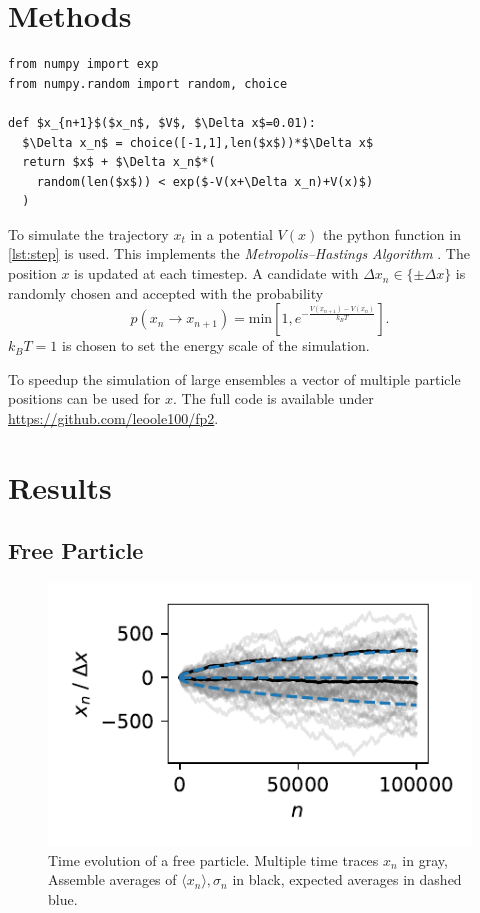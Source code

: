 \documentclass[
    parskip=half, 
    twoside=false,
    twocolumn=true,
    fontsize=11pt,
]{scrarticle}
\begin{document}
\section{Methods}
\begin{lstlisting}[caption={Python function used for time evolution.},label={lst:step},captionpos=b]
from numpy import exp
from numpy.random import random, choice

def $x_{n+1}$($x_n$, $V$, $\Delta x$=0.01):
  $\Delta x_n$ = choice([-1,1],len($x$))*$\Delta x$
  return $x$ + $\Delta x_n$*(
    random(len($x$)) < exp($-V(x+\Delta x_n)+V(x)$)
  )
\end{lstlisting}
To simulate the trajectory $x_t$ in a potential $V(x)$ the python function in \autoref{lst:step} is used.
This implements the \textit{Metropolis–Hastings Algorithm} \cite{noauthor_metropolis-algorithmus_2024}.
The position $x$ is updated at each timestep.
A candidate with $\Delta x_n \in \{\pm \Delta x\}$ is randomly chosen and accepted with the probability
$$ p(x_n \rightarrow x_{n+1}) = \text{min}\left[1,e^{-\frac{V(x_{n+1})-V(x_n)}{k_B T}}\right] \text{.}$$
$k_B T = 1$ is chosen to set the energy scale of the simulation.

To speedup the simulation of large ensembles a vector of multiple particle positions can be used for $x$.
The full code is available under \url{https://github.com/leoole100/fp2}.

\section{Results}
\subsection{Free Particle}
\begin{figure}
    \centering
    \includegraphics{figures/01 time trace.pdf}
    \caption{
        Time evolution of a free particle.
        Multiple time traces $x_n$ in gray, Assemble averages of $\langle x_n\rangle, \sigma_n$ in black, expected averages in dashed blue.
    }
    \label{fig:pt1_trajectory}
\end{figure}
\end{document}
